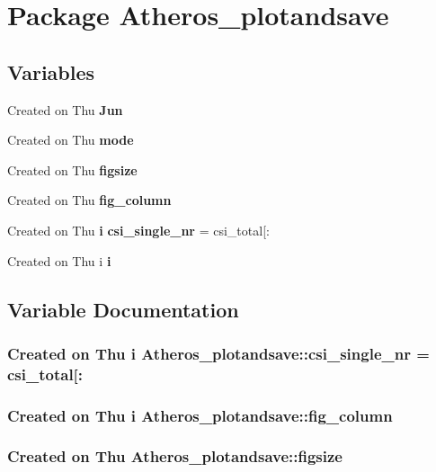 \section{Package Atheros\_\-plotandsave}
\label{namespaceAtheros__plotandsave}


\subsection*{Variables}
\begin{CompactItemize}
\item 
Created on Thu {\bf Jun}
\item 
Created on Thu {\bf mode}
\item 
Created on Thu {\bf figsize}
\item 
Created on Thu {\bf fig\_\-column}
\item 
Created on Thu {\bf i} {\bf csi\_\-single\_\-nr} = csi\_\-total[:
\item 
Created on Thu i {\bf i}
\end{CompactItemize}


\subsection{Variable Documentation}
\subsubsection{\setlength{\rightskip}{0pt plus 5cm}Created on Thu {\bf i} Atheros\_\-plotandsave::csi\_\-single\_\-nr = csi\_\-total[:}\label{namespaceAtheros__plotandsave_a4}


\subsubsection{\setlength{\rightskip}{0pt plus 5cm}Created on Thu {\bf i} Atheros\_\-plotandsave::fig\_\-column}\label{namespaceAtheros__plotandsave_a3}


\subsubsection{\setlength{\rightskip}{0pt plus 5cm}Created on Thu Atheros\_\-plotandsave::figsize}\label{namespaceAtheros__plotandsave_a2}


